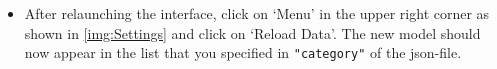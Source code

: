 \begin{itemize}
\item After relaunching the interface, click on `Menu' in the upper right corner as shown in \ref{img:Settings} and click on `Reload Data'. The new model should now appear in the list that you specified in \texttt{"category"} of the json-file. 
\end{itemize}

